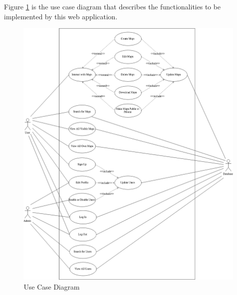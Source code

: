 Figure \ref{Use Case Diagram} is the use case diagram that describes the functionalities to be implemented by this web application.

\begin{figure}[!htbp]
\centering
\includegraphics[width=\textwidth]{section02/assets/use_case.png}
\caption[Use Case Diagram]{\label{Use Case Diagram}Use Case Diagram}
\end{figure}

